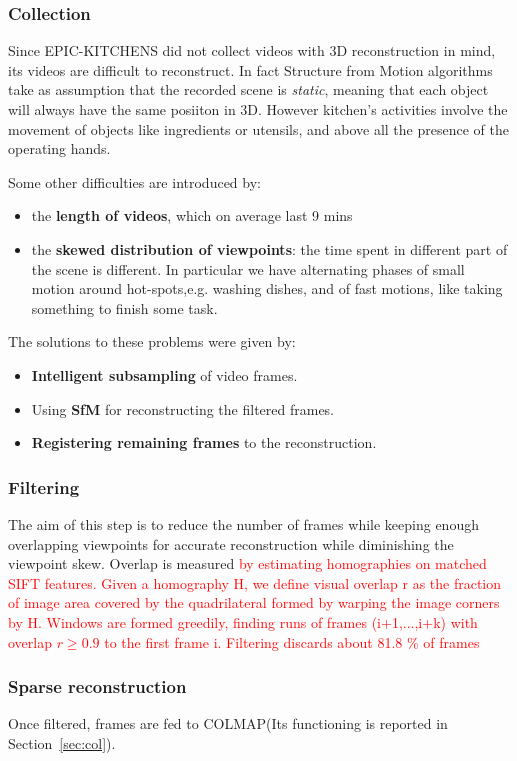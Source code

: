 \subsubsection{Collection}
Since EPIC-KITCHENS did not collect videos with 3D reconstruction in mind, its videos are difficult to reconstruct. In fact Structure from Motion algorithms take as assumption
that the recorded scene is \textit{static}, meaning that each object will always have the same posiiton in 3D. However kitchen's activities involve the movement of objects like 
ingredients or utensils, and above all the presence of the operating hands.

Some other difficulties are introduced by:
\begin{itemize}
    \item the \textbf{length of videos}, which on average last 9 mins
    \item the \textbf{skewed distribution of viewpoints}: the time spent in different part of the scene is different. In particular we have alternating phases of small motion
    around hot-spots,e.g. washing dishes, and of fast motions, like taking something to finish some task.
\end{itemize} 
The solutions to these problems were given by:
\begin{itemize}
    \item\textbf{ Intelligent subsampling} of video frames.
    \item Using \textbf{SfM} for reconstructing the filtered frames.
    \item \textbf{Registering remaining frames} to the reconstruction.
\end{itemize}

\subsubsection{Filtering}
The aim of this step is to reduce the number of frames while keeping enough overlapping viewpoints for accurate reconstruction while diminishing the viewpoint skew.
Overlap is measured \textcolor{red}{by estimating homographies  on matched SIFT features. Given a homography H, we define visual overlap r as the fraction of image 
area covered by the quadrilateral formed by warping the image corners by H. Windows are formed greedily, finding runs of frames 
(i+1,...,i+k) with overlap $r\geq0.9$ to the first frame i. Filtering discards about 81.8 \% of frames}

\subsubsection{Sparse reconstruction}
Once filtered, frames are fed to COLMAP(Its functioning is reported in Section~\ref{sec:col}).
